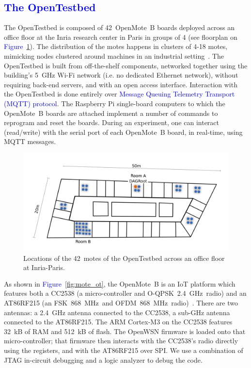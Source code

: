 \documentclass[sensors,article,submit,moreauthors,pdftex]{Definitions/mdpi}
\newcommand{\fsk}           {FSK~868~MHz}
\newcommand{\oqpsk}         {O-QPSK~2.4~GHz}
\newcommand{\ofdm}          {OFDM~868~MHz}
\newcommand{\figwidth}      {0.78}
\newcommand{\update}[1]     {\textcolor{blue}{#1}}
\begin{document}
\subsection{\update{The OpenTestbed}}
\label{sec:opentestbed}


The OpenTestbed is composed of 42~OpenMote~B boards deployed across an office floor at the Inria research center in Paris in groups of 4 (see floorplan on \update{Figure}~\ref{fig:building_motes}).
The distribution of the motes happens in clusters of 4-18 motes, mimicking nodes clustered around machines in an industrial setting~\cite{civerchia17industrial}.
The OpenTestbed is built from off-the-shelf components,
    networked together using the building's 5~GHz Wi-Fi network (i.e. no dedicated Ethernet network),
    without requiring back-end servers, and
    with an open access interface.
Interaction with the OpenTestbed is done entirely over \update{Message Queuing Telemetry Transport (MQTT) protocol}.
The Raspberry Pi single-board computers to which the OpenMote~B boards are attached implement a number of commands to reprogram and reset the boards.
During an experiment, one can interact (read/write) with the serial port of each OpenMote~B board, in real-time, using MQTT messages.

\begin{figure}[ht]
	\centering
	\includegraphics[width=\figwidth\columnwidth]{building_motes}
	\caption{Locations of the 42~motes of the OpenTestbed across an office floor at Inria-Paris.}
    \label{fig:building_motes}
\end{figure}


As shown in \update{Figure}~\ref{fig:mote_ot}, the OpenMote~B is an IoT platform which features both
    a CC2538 (a micro-controller and \oqpsk\ radio) and
    an AT86RF215 (an \fsk\ and \ofdm\  radio)~\cite{tuset16openmote}.
There are two antennas:
    a 2.4~GHz antenna connected to the CC2538,
    a sub-GHz antenna connected to the AT86RF215.
The ARM Cortex-M3 on the CC2538 features 32~kB of RAM and 512~kB of flash.
The OpenWSN firmware is loaded onto that micro-controller;
    that firmware then interacts with the CC2538's radio directly using the registers,
    and with the AT86RF215 over SPI.
We use a combination of JTAG in-circuit debugging and a logic analyzer to debug the code.
\end{document}
